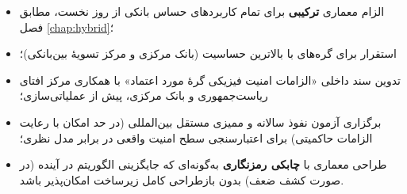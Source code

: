 \begin{itemize}
\item الزام معماری \textbf{ترکیبی } برای تمام کاربردهای حساس بانکی از روز نخست، مطابق فصل \ref{chap:hybrid}؛
\item استقرار  برای گره‌های با بالاترین حساسیت (بانک مرکزی و مرکز تسویهٔ بین‌بانکی)؛
\item تدوین سند داخلی «الزامات امنیت فیزیکی گرهٔ مورد اعتماد» با همکاری مرکز افتای ریاست‌جمهوری و بانک مرکزی، پیش از عملیاتی‌سازی؛
\item برگزاری آزمون نفوذ سالانه و ممیزی مستقل بین‌المللی (در حد امکان با رعایت الزامات حاکمیتی) برای اعتبارسنجی سطح امنیت واقعی در برابر مدل نظری؛
\item طراحی معماری با \textbf{چابکی رمزنگاری } به‌گونه‌ای که جایگزینی الگوریتم  در آینده (در صورت کشف ضعف) بدون بازطراحی کامل زیرساخت امکان‌پذیر باشد.
\end{itemize}

